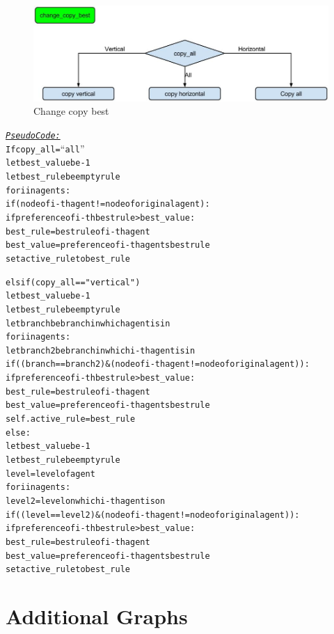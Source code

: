 \documentclass[a4paper]{article}
\begin{document}
\begin{figure}[!ht]
\includegraphics[width =\textwidth]{change_copy_best.jpg}
\caption{Change copy best}
\label{change_copy_best}
\end{figure}
\begin{alltt}
 \underline{\textit{Pseudo Code:}}
If copy_all = “all”
    let best_value be  -1
            let best_rule be empty rule
            for i in agents:
                if (node of i-th agent != node of original agent):
                        if preference of i-th best rule> best_value:
                            best_rule = best rule of i-th agent
                            best_value = preference of i-th agents best rule
            set active_rule  to  best_rule

elsif (copy_all == "vertical")
            let best_value be -1
            let best_rule be empty rule
            let branch be branch in which agent is in 
            for i in agents:
                let branch2 be branch in which  i-th agent is in  
                if ((branch == branch2) &(node of i-th agent != node of original agent)):
                        if preference of i-th best rule > best_value:
                                best_rule = best rule of i-th agent
                                best_value = preference of i-th agents best rule
            self.active_rule = best_rule
    else:
            let best_value be -1
            let best_rule be empty rule
            level = level of agent
            for i in agents:
                level2 = level on which i-th agent is on 
                if ((level == level2) & (node of i-th agent != node of original agent)):
                        if preference of i-th best rule > best_value:
                                best_rule = best rule of i-th agent
                                best_value = preference of i-th agents best rule
             set active_rule to  best_rule
\end{alltt}


\clearpage
\section{Additional Graphs}
\end{document}

